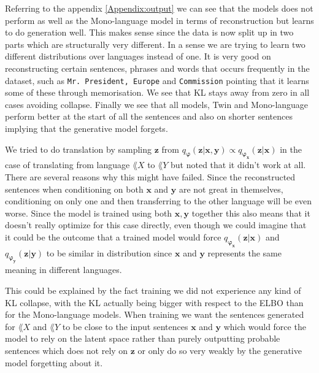 Referring to the appendix \ref{Appendix:output} we can see that the models does
not perform as well as the Mono-language model in terms of reconstruction but
learns to do generation well. This makes sense since the data
is now split up in two parts which are structurally very different. In a sense
we are trying to learn two different distributions over languages instead of
one. It is very good on reconstructing certain sentences, phrases and words that occurs
frequently in the dataset, such as \texttt{Mr. President, Europe} and
\texttt{Commission} pointing that it learns some of these through memorisation.
We see that KL stays away from zero in all cases avoiding collapse. Finally we
see that all models, Twin and Mono-language perform better at the start of all
the sentences and also on shorter sentences implying that the generative model forgets.

We tried to do translation by sampling $\bm{z}$ from $q_{\bm{\varphi}}(\bm{z} |
\bm{x}, \bm{y}) \propto q_{\bm{\varphi}_{\bm{x}}}(\bm{z} |
\bm{x})$ in the case of translating from language $\lang{X}$ to $\lang{Y}$ but
noted that it didn't work at all. There are several reasons why this might have
failed. Since the reconstructed sentences when conditioning on both $\bm{x}$ and
$\bm{y}$ are not great in themselves, conditioning on only one and then
transferring to the other language will be even worse. Since the model is
trained using both $\bm{x}, \bm{y}$ together this also means that it doesn't
really optimize for this case directly, even though we could imagine that it
could be the outcome that a trained model would force $q_{\bm{\varphi}_{\bm{x}}}(\bm{z} |
\bm{x})$ and $q_{\bm{\varphi}_{\bm{y}}}(\bm{z} |
\bm{y})$ to be similar in distribution since $\bm{x}$ and $\bm{y}$ represents
the same meaning in different languages.

This could be explained by the fact training we did not experience any kind of
KL collapse, with the KL actually being bigger with respect to the ELBO than for
the Mono-language models. When training we want the sentences generated for $\lang{X}$ and
$\lang{Y}$ to be close to the input sentences $\bm{x}$ and $\bm{y}$ which would
force the model to rely on the latent space rather than purely outputting
probable sentences which does not rely on $\bm{z}$ or only do so very weakly by
the generative model forgetting about it.